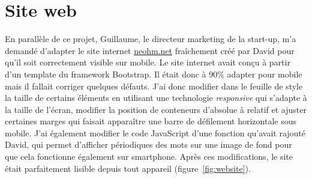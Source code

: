 \documentclass[a4paper, 12pt]{report}
\begin{document}
\section{Site web}
En parallèle de ce projet, Guillaume, le directeur marketing de la start-up, m’a demandé d’adapter le site internet \url{neohm.net} fraîchement créé par David pour qu’il soit correctement visible sur mobile.
Le site internet avait conçu à partir d’un template du framework Bootstrap. Il était donc à 90\% adapter pour mobile mais il fallait corriger quelques défauts. J’ai donc modifier dans le feuille de style la taille de certains éléments en utilisant une technologie \emph{responsive} qui s’adapte à la taille de l’écran, modifier la position de conteneurs d’absolue à relatif et ajuster certaines marges qui faisait apparaître une barre de défilement horizontale sous mobile. J’ai également modifier le code JavaScript d’une fonction qu’avait rajouté David, qui permet d’afficher périodiques des mots sur une image de fond pour que cela fonctionne également sur smartphone. Après ces modifications, le site était parfaitement lisible depuis tout appareil (figure~\ref{fig:website}).
\end{document}
